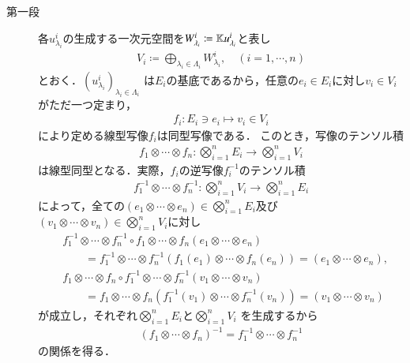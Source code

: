 	\begin{prf}\mbox{}
		\begin{description}
			\item[第一段]
				各$u^i_{\lambda_i}$の生成する一次元空間を$W^i_{\lambda_i} \coloneqq \mathbb{K} u^i_{\lambda_i}$と表し
				\begin{align}
					V_i \coloneqq \bigoplus_{\lambda_i \in \Lambda_i} W^i_{\lambda_i},
					\quad (i=1,\cdots,n)
				\end{align}
				とおく．$\left( u^i_{\lambda_i} \right)_{\lambda_i \in \Lambda_i}$
				は$E_i$の基底であるから，任意の$e_i \in E_i$に対し$v_i \in V_i$がただ一つ定まり，
				\begin{align}
					f_i:E_i \ni e_i \longmapsto v_i \in V_i
				\end{align}
				により定める線型写像$f_i$は同型写像である．
				このとき，写像のテンソル積
				\begin{align}
					f_1 \otimes \cdots \otimes f_n:
					\bigotimes_{i=1}^n E_i \longrightarrow \bigotimes_{i=1}^n V_i
				\end{align}
				は線型同型となる．実際，$f_i$の逆写像$f^{-1}_i$のテンソル積
				\begin{align}
					f^{-1}_1 \otimes \cdots \otimes f^{-1}_n:
					\bigotimes_{i=1}^n V_i \longrightarrow \bigotimes_{i=1}^n E_i
				\end{align}
				によって，全ての$(e_1 \otimes\cdots\otimes e_n) \in \bigotimes_{i=1}^n E_i$及び
				$(v_1 \otimes\cdots\otimes v_n) \in \bigotimes_{i=1}^n V_i$に対し
				\begin{align}
					&f^{-1}_1 \otimes \cdots \otimes f^{-1}_n \circ 
						f_1 \otimes \cdots \otimes f_n
						(e_1 \otimes \cdots \otimes e_n) \\
					&\qquad = f^{-1}_1 \otimes \cdots \otimes f^{-1}_n
						\left( f_1(e_1) \otimes \cdots \otimes f_n(e_n) \right)
						= (e_1 \otimes \cdots \otimes e_n), \\
					&f_1 \otimes \cdots \otimes f_n \circ 
						f^{-1}_1 \otimes \cdots \otimes f^{-1}_n
						(v_1 \otimes \cdots \otimes v_n) \\
					&\qquad = f_1 \otimes \cdots \otimes f_n
						\left( f^{-1}_1(v_1) \otimes \cdots \otimes f^{-1}_n(v_n) \right)
						= (v_1 \otimes \cdots \otimes v_n)
				\end{align}
				が成立し，それぞれ$\bigotimes_{i=1}^n E_i$と$\bigotimes_{i=1}^n V_i$
				を生成するから
				\begin{align}
					(f_1 \otimes \cdots \otimes f_n)^{-1}
					= f^{-1}_1 \otimes \cdots \otimes f^{-1}_n
				\end{align}
				の関係を得る．
				

\end{description}
\end{prf}
